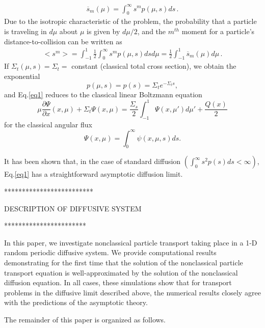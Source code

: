 \documentclass{anstrans}
\newcommand{\bl}{\big<}
\newcommand{\bg}{\big>}
\begin{document}
\begin{align}\label{eq3}
\overline s_m(\mu) = \int_0^{\infty} s^mp(\mu,s)ds\,.
\end{align}
Due to the isotropic characteristic of the problem, the probability that a particle is traveling in $d\mu$ about $\mu$ is given by $d\mu/2$, and the $m^{th}$ moment for a particle's distance-to-collision can be written as
\begin{align}\label{eq4}
\bl s^m \bg = \int_{-1}^1\frac{1}{2}\int_0^{\infty}s^mp(\mu,s)dsd\mu = \frac{1}{2}\int_{-1}^1\overline s_m(\mu)d\mu\,.
\end{align}
If $\Sigma_t(\mu,s) = \Sigma_t = $ constant (classical total cross section), we obtain the exponential
\begin{equation}\label{eq5}
p(\mu,s) = p(s) = \Sigma_t e^{-\Sigma_ts},
\end{equation}
and Eq.\eqref{eq1} reduces to the classical linear Boltzmann equation
\begin{equation}
\label{eq6}
\mu\frac{\partial \Psi}{\partial x}(x,\mu) + \Sigma_t \Psi(x,\mu) = \frac{\Sigma_s}{2}\int_{-1}^1\Psi(x,\mu')d\mu'+ \frac{Q(x)}{2}
\end{equation}
for the classical angular flux 
\begin{equation}
\label{eq7}
\Psi(x,\mu) = \int_0^\infty \psi(x,\mu,s)ds.
\end{equation} 

It has been shown that, in the case of standard diffusion $\left(\int_0^{\infty} s^2p(s)ds < \infty\right)$,  Eq.\eqref{eq1} has a straightforward asymptotic diffusion limit.  

*************************

DESCRIPTION OF DIFFUSIVE SYSTEM

***********************

In this paper, we investigate nonclassical particle transport taking place in a 1-D random periodic diffusive system. We provide computational results demonstrating for the first time that the solution of the nonclassical particle
transport equation is well-approximated by the solution of the nonclassical diffusion equation. In all cases, these
simulations show that for transport problems in the diffusive limit described above, the numerical results closely agree with the predictions of the asymptotic theory. 

The remainder of this paper is organized as follows.


\end{document}
